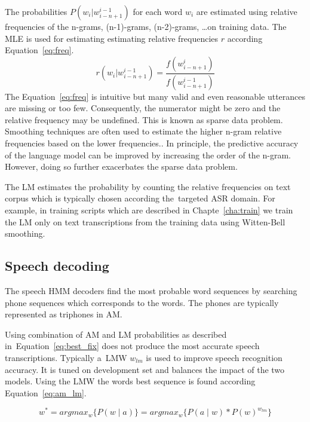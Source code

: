 The probabilities $P(w_i|w^{i-1}_{i-n+1})$ for each word $w_i$ are estimated using relative frequencies of the n-grams, (n-1)-grams, (n-2)-grams, \ldots on training data.
The \ac{MLE} is used for estimating estimating relative frequencies $r$ according Equation~\ref{eq:freq}.
\begin{equation} \label{eq:freq}
    r(w_i|w^{i-1}_{i-n+1}) = \frac{f(w^i_{i-n+1})} {f(w^{i-1}_{i-n+1})}
\end{equation}
The Equation~\ref{eq:freq} is intuitive but many valid and even reasonable utterances are missing or too few.
Consequently, the numerator might be zero and the relative frequency may be undefined.
This is known as sparse data problem.
Smoothing techniques are often used to estimate the higher n-gram relative frequencies based on the lower frequencies.\cite{goodman2001bit}.
In principle, the predictive accuracy of the language model can be improved by increasing the order of the n-gram.
However, doing so further exacerbates the sparse data problem.\cite{brants2007large}

The \ac{LM} estimates the probability by counting the relative frequencies on text corpus which is typically chosen according the~targeted \ac{ASR} domain.
For example, in training scripts which are described in Chapte~\ref{cha:train} we train the \ac{LM} only on text transcriptions from the training data using Witten-Bell smoothing.\cite{witten1991zero}


\subsection{Speech decoding}
\label{sub:decode}
The speech \ac{HMM} decoders find the most probable word sequences by searching phone sequences which corresponds to the words.
The phones are typically represented as triphones in \ac{AM}.

Using combination of \ac{AM} and \ac{LM} probabilities as described in~Equation~\ref{eq:best_fix} does not produce the most accurate speech transcriptions. 
Typically a~\ac{LMW} $w_{lm}$ is used to improve speech recognition accuracy.
It is tuned on development set and balances the impact of the two models.
Using the \ac{LMW} the words best sequence is found according Equation~\ref{eq:am_lm}.

\begin{equation}\label{eq:am_lm}
    w^* = argmax_{w}\{P(w \mid a)\} = argmax_{w}\{P(a \mid w) * P(w)^{w_{lm}}\}
\end{equation}

